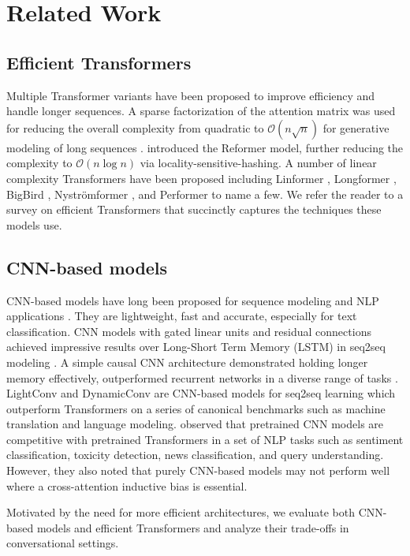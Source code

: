\section{Related Work}
\subsection{Efficient Transformers} \label{eff_trans_rel_work}

Multiple Transformer variants have been proposed to improve efficiency and handle longer sequences. 
A sparse factorization of the attention matrix was used for reducing the overall complexity from quadratic to $\mathcal{O}(n\sqrt{n})$ for generative modeling of long sequences \citep{child2019generating}. 
\citet{Kitaev2020Reformer} introduced the Reformer model, further reducing the complexity to $\mathcal{O}(n\log{}n)$ via locality-sensitive-hashing. 
A number of linear complexity Transformers have been proposed including Linformer \citep{wang2020linformer}, Longformer \citep{beltagy2020longformer}, BigBird \citep{zaheer2020big}, Nystr{\"o}mformer \citep{xiong2021nystromformer}, and Performer \citep{choromanski2021rethinking} to name a few. 
We refer the reader to a survey on efficient Transformers \citep{tay2020efficient} that succinctly captures the techniques these models use.


\subsection{CNN-based models}

CNN-based models have long been proposed for sequence modeling and NLP applications \citep{kim-2014-convolutional, bai2018empirical, kalchbrenner2016neural}. 
They are lightweight, fast and accurate, especially for text classification. 
CNN models with gated linear units \citep{dauphin2017language} and residual connections \citep{he2016deep} achieved impressive results over Long-Short Term Memory (LSTM) \citep{hochreiter1997long} in seq2seq modeling \citep{gehring2017convolutional}. 
A simple causal CNN architecture demonstrated holding longer memory effectively, outperformed recurrent networks in a diverse range of tasks \citep{bai2018empirical}.
LightConv and DynamicConv \citep{wu2018pay} are CNN-based models for seq2seq learning which outperform Transformers on a series of canonical benchmarks such as machine translation and language modeling.  
\citet{tay-etal-2021-pretrained} observed that pretrained CNN models are competitive with pretrained Transformers in a set of NLP tasks such as sentiment classification, toxicity detection, news classification, and query understanding. 
However, they also noted that purely CNN-based models may not perform well where a cross-attention inductive bias is essential. 


Motivated by the need for more efficient architectures, we evaluate both CNN-based models and efficient Transformers and analyze their trade-offs in conversational settings.